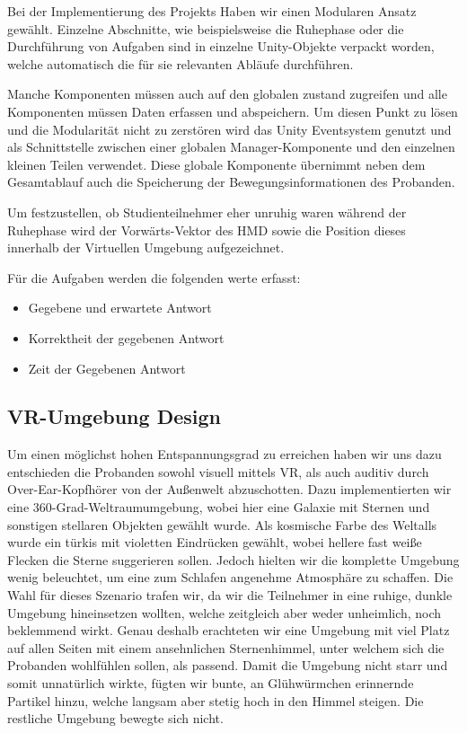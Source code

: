 Bei der Implementierung des Projekts Haben wir einen Modularen Ansatz gewählt. Einzelne Abschnitte, wie beispielsweise die Ruhephase oder die Durchführung von Aufgaben sind in einzelne Unity-Objekte verpackt worden, welche automatisch die für sie relevanten Abläufe durchführen. 

Manche Komponenten müssen auch auf den globalen zustand zugreifen und alle Komponenten müssen Daten erfassen und abspeichern. Um diesen Punkt zu lösen und die Modularität nicht zu zerstören wird das Unity Eventsystem genutzt und als Schnittstelle zwischen einer globalen Manager-Komponente und den einzelnen kleinen Teilen verwendet. 
Diese globale Komponente übernimmt neben dem Gesamtablauf auch die Speicherung der Bewegungsinformationen des Probanden. 

Um festzustellen, ob Studienteilnehmer eher unruhig waren während der Ruhephase wird der Vorwärts-Vektor des HMD sowie die Position dieses innerhalb der Virtuellen Umgebung aufgezeichnet.

Für die Aufgaben werden die folgenden werte erfasst:
\begin{itemize}
    \item Gegebene und erwartete Antwort
    \item Korrektheit der gegebenen Antwort
    \item Zeit der Gegebenen Antwort
\end{itemize}

\subsection{VR-Umgebung Design}

Um einen möglichst hohen Entspannungsgrad zu erreichen haben wir uns dazu entschieden die Probanden sowohl visuell mittels VR, als auch auditiv durch Over-Ear-Kopfhörer von der Außenwelt abzuschotten. Dazu implementierten wir eine 360-Grad-Weltraumumgebung, wobei hier eine Galaxie mit Sternen und sonstigen stellaren Objekten gewählt wurde. Als kosmische Farbe des Weltalls wurde ein türkis mit violetten Eindrücken gewählt, wobei hellere fast weiße Flecken die Sterne suggerieren sollen. Jedoch hielten wir die komplette Umgebung wenig beleuchtet, um eine zum Schlafen angenehme Atmosphäre zu schaffen. Die Wahl für dieses Szenario trafen wir, da wir die Teilnehmer in eine ruhige, dunkle Umgebung hineinsetzen wollten, welche zeitgleich aber weder unheimlich, noch beklemmend wirkt. Genau deshalb erachteten wir eine Umgebung mit viel Platz auf allen Seiten mit einem ansehnlichen Sternenhimmel, unter welchem sich die Probanden wohlfühlen sollen, als passend. Damit die Umgebung nicht starr und somit unnatürlich wirkte, fügten wir bunte, an Glühwürmchen erinnernde Partikel hinzu, welche langsam aber stetig hoch in den Himmel steigen. Die restliche Umgebung bewegte sich nicht.

